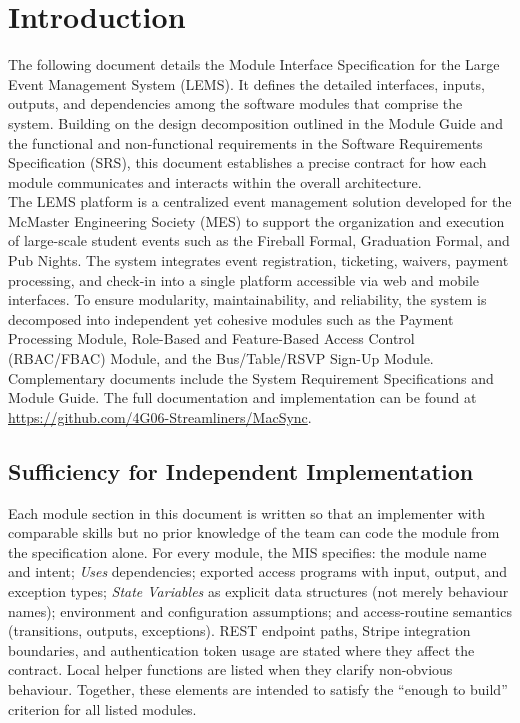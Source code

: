 \documentclass[12pt, titlepage]{article}
\begin{document}
\newpage

\tableofcontents

\newpage


\section{Introduction}

The following document details the Module Interface Specification for the Large Event Management System (LEMS).
It defines the detailed interfaces, inputs, outputs, and dependencies among the software modules that comprise the
system. Building on the design decomposition outlined in the Module Guide and the functional and non-functional
requirements in the Software Requirements Specification (SRS), this document establishes a precise contract for how
each module communicates and interacts within the overall architecture.\\

\noindent
The LEMS platform is a centralized event management solution developed for the McMaster Engineering Society (MES)
to support the organization and execution of large-scale student events such as the Fireball Formal, Graduation
Formal, and Pub Nights. The system integrates event registration, ticketing, waivers, payment processing, and
check-in into a single platform accessible via web and mobile interfaces. To ensure modularity, maintainability, and
reliability, the system is decomposed into independent yet cohesive modules such as the Payment Processing Module,
Role-Based and Feature-Based Access Control (RBAC/FBAC) Module, and the Bus/Table/RSVP Sign-Up Module.\\

\noindent
Complementary documents include the System Requirement Specifications
and Module Guide.  The full documentation and implementation can be
found at \url{https://github.com/4G06-Streamliners/MacSync}.

\subsection{Sufficiency for Independent Implementation}

\noindent
Each module section in this document is written so that an implementer with comparable skills
 but no prior knowledge of the team can code the module from the specification alone.
For every module, the MIS specifies: the module name and intent; \emph{Uses} dependencies;
 exported access programs with input, output, and exception types; \emph{State Variables} as
 explicit data structures (not merely behaviour names); environment and configuration assumptions;
 and access-routine semantics (transitions, outputs, exceptions).
REST endpoint paths, Stripe integration boundaries, and authentication token usage are stated where
 they affect the contract.
Local helper functions are listed when they clarify non-obvious behaviour.
Together, these elements are intended to satisfy the ``enough to build'' criterion for all listed modules.
\end{document}
